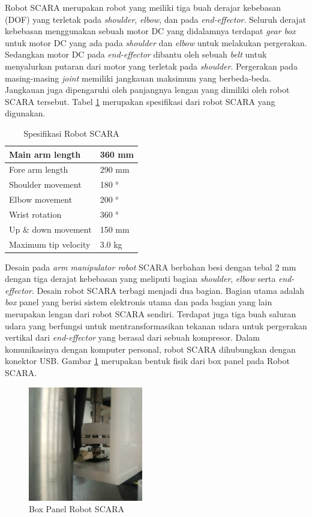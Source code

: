 Robot SCARA merupakan robot yang meiliki tiga buah derajar kebebasan (DOF) yang terletak pada \textit{shoulder}, \textit{elbow}, dan pada \textit{end-effector}. Seluruh derajat kebebasan menggunakan sebuah motor DC yang didalamnya terdapat\textit{ gear box} untuk motor DC yang ada pada \textit{shoulder} dan \textit{elbow} untuk melakukan pergerakan. Sedangkan motor DC pada \textit{end-effector} dibantu oleh sebuah \textit{belt} untuk menyalurkan putaran dari motor yang terletak pada \textit{shoulder}. Pergerakan pada masing-masing \textit{joint} memiliki jangkauan maksimum yang berbeda-beda. Jangkauan juga dipengaruhi oleh panjangnya lengan yang dimiliki oleh robot SCARA tersebut. Tabel \ref{tbl.spesifikasiscara} merupakan spesifikasi dari robot SCARA yang digunakan.


\begin{table}[H]
	\centering
	\caption{Spesifikasi Robot SCARA}
	\label{tbl.spesifikasiscara}
		\begin{tabular}{|l|l|}
			\hline
			Main arm length      & 360 mm		\\ \hline
			Fore arm length      & 290 mm  				\\ \hline
			Shoulder movement    & 180 °  		\\ \hline
			Elbow movement       & 200 °   		\\ \hline
			Wrist rotation       & 360 ° 		\\ \hline
			Up \& down movement  & 150 mm   				\\ \hline
			Maximum tip velocity & 3.0 kg  				\\ \hline
		\end{tabular} 
	\end{table}
Desain pada\textit{ arm manipulator robot} SCARA berbahan besi dengan tebal 2 mm dengan tiga derajat kebebasan yang meliputi bagian \textit{shoulder}, \textit{elbow} serta \textit{end-effector}. Desain robot SCARA terbagi menjadi dua bagian. Bagian utama adalah \textit{box} panel yang berisi sistem elektronis utama dan pada bagian yang lain merupakan lengan dari robot SCARA sendiri. Terdapat juga tiga buah saluran udara yang berfungsi untuk mentransformasikan tekanan udara untuk pergerakan vertikal dari \textit{end-effector} yang berasal dari sebuah kompresor.  Dalam komunikasinya dengan komputer personal, robot SCARA dihubungkan dengan konektor USB. Gambar \ref{pic.boxpanel} merupakan bentuk fisik dari box panel pada Robot SCARA.
\begin{figure}[H]
	\centering
	\includegraphics[width=5cm]{gambar/potsementara.jpg}
	\caption{Box Panel Robot SCARA}
	\label{pic.boxpanel}
\end{figure}

